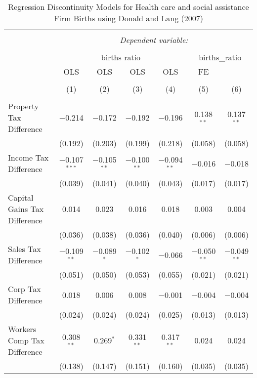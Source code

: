 
\begin{table}[!htbp] \centering 
  \caption{Regression Discontinuity Models for  Health care and social assistance Firm Births using Donald and Lang (2007)} 
  \label{} 
\begin{tabular}{@{\extracolsep{5pt}}lcccccc} 
\\[-1.8ex]\hline 
\hline \\[-1.8ex] 
 & \multicolumn{6}{c}{\textit{Dependent variable:}} \\ 
\cline{2-7} 
\\[-1.8ex] & \multicolumn{4}{c}{births ratio} & \multicolumn{2}{c}{births\_ratio} \\ 
 & OLS & OLS & OLS & OLS & FE &  \\ 
\\[-1.8ex] & (1) & (2) & (3) & (4) & (5) & (6)\\ 
\hline \\[-1.8ex] 
 Property Tax Difference & $-$0.214 & $-$0.172 & $-$0.192 & $-$0.196 & 0.138$^{**}$ & 0.137$^{**}$ \\ 
  & (0.192) & (0.203) & (0.199) & (0.218) & (0.058) & (0.058) \\ 
  Income Tax Difference & $-$0.107$^{***}$ & $-$0.105$^{**}$ & $-$0.100$^{**}$ & $-$0.094$^{**}$ & $-$0.016 & $-$0.018 \\ 
  & (0.039) & (0.041) & (0.040) & (0.043) & (0.017) & (0.017) \\ 
  Capital Gains Tax Difference & 0.014 & 0.023 & 0.016 & 0.018 & 0.003 & 0.004 \\ 
  & (0.036) & (0.038) & (0.036) & (0.040) & (0.006) & (0.006) \\ 
  Sales Tax Difference & $-$0.109$^{**}$ & $-$0.089$^{*}$ & $-$0.102$^{*}$ & $-$0.066 & $-$0.050$^{**}$ & $-$0.049$^{**}$ \\ 
  & (0.051) & (0.050) & (0.053) & (0.055) & (0.021) & (0.021) \\ 
  Corp Tax Difference & 0.018 & 0.006 & 0.008 & $-$0.001 & $-$0.004 & $-$0.004 \\ 
  & (0.024) & (0.024) & (0.024) & (0.025) & (0.013) & (0.013) \\ 
  Workers Comp Tax Difference & 0.308$^{**}$ & 0.269$^{*}$ & 0.331$^{**}$ & 0.317$^{**}$ & 0.024 & 0.024 \\ 
  & (0.138) & (0.147) & (0.151) & (0.160) & (0.035) & (0.035) \\ 

\end{tabular}
\end{table}
